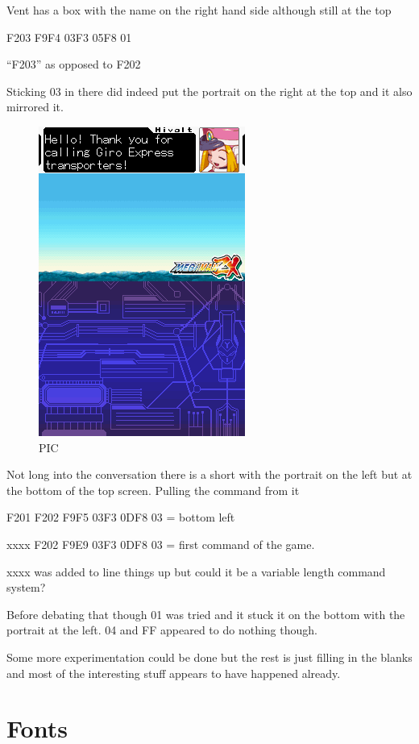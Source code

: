 \documentclass[
]{book}
\begin{document}
Vent has a box with the name on the right hand side although still at the top

F203 F9F4 03F3 05F8 01

``F203'' as opposed to F202

Sticking 03 in there did indeed put the portrait on the right at the top and it also mirrored it.

\begin{figure}
\centering
\includegraphics{images/109_home_fast6191_romhackingguide_unrenamed_fil___iginal_borders_romhackingguidemarkupexedit4.png}
\caption{PIC}
\end{figure}

Not long into the conversation there is a short with the portrait on the left but at the bottom of the top screen. Pulling the command from it

F201 F202 F9F5 03F3 0DF8 03 = bottom left

xxxx F202 F9E9 03F3 0DF8 03 = first command of the game.

xxxx was added to line things up but could it be a variable length command system?

Before debating that though 01 was tried and it stuck it on the bottom with the portrait at the left. 04 and FF appeared to do nothing though.

Some more experimentation could be done but the rest is just filling in the blanks and most of the interesting stuff appears to have happened already.

\hypertarget{fonts}{%
\section{Fonts}\label{fonts}}
\end{document}
